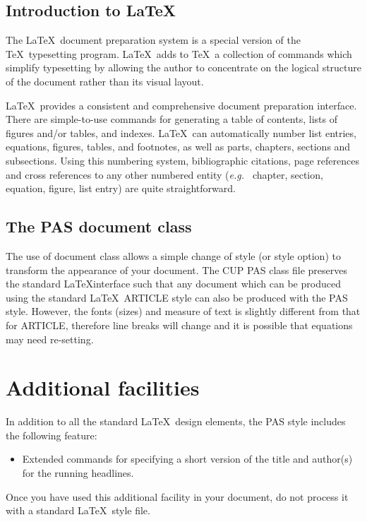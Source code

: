\documentclass{pas}
\begin{document}
\subsection{Introduction to \LaTeX}

The \LaTeX\ document preparation system is a special version of the
\TeX\ typesetting program. \LaTeX\ adds to \TeX\ a collection of
commands which simplify typesetting by allowing the author to
concentrate on the logical structure of the document rather than
its visual layout.

\LaTeX\ provides a consistent and comprehensive document preparation
interface. There are simple-to-use commands for generating a table of
contents, lists of figures and/or tables, and indexes. \LaTeX\ can
automatically number list entries, equations, figures, tables, and
footnotes, as well as parts, chapters, sections and subsections.
Using this numbering system, bibliographic citations, page references
and cross references to any other numbered entity ({\it e.g.\ } chapter,
section, equation, figure, list entry) are quite straightforward.

\subsection{The PAS document class}

The use of document class allows a simple change of style (or style option)
to transform the appearance of your document. The CUP PAS class file preserves
the standard \LaTeX interface such that any document which can be produced
using the standard \LaTeX\ ARTICLE style can also be produced with the
PAS style. However, the fonts (sizes) and measure of text is slightly different
from that for ARTICLE, therefore line breaks will change and it is possible
that equations may need re-setting.

\section{Additional facilities}

In addition to all the standard \LaTeX\ design elements, the PAS style
includes the following feature:
\begin{itemize}
  \item Extended commands for specifying a short version
        of the title and author(s) for the running
        headlines.
\end{itemize}
Once you have used this additional facility in your document,
do not process it with a standard \LaTeX\ style file.
\end{document}
